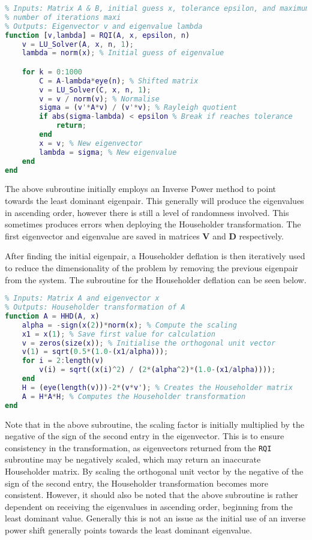 \documentclass[11pt,oneside]{article}
\begin{document}
\begin{lstlisting}[language=Matlab]
%% Rayleigh Quotient function to find eigenvalues and eigenvectors
% Inputs: Matrix A & B, initial guess x, tolerance epsilon, and maximum
% number of iterations maxi
% Outputs: Eigenvector v and eigenvalue lambda
function [v,lambda] = RQI(A, x, epsilon, n)
    v = LU_Solver(A, x, n, 1);
    lambda = norm(x); % Initial guess of eigenvalue

    for k = 0:1000
        C = A-lambda*eye(n); % Shifted matrix
        v = LU_Solver(C, x, n, 1); 
        v = v / norm(v); % Normalise
        sigma = (v'*A*v) / (v'*v); % Rayleigh quotient
        if abs(sigma-lambda) < epsilon % Break if reaches tolerance
            return;
        end
        x = v; % New eigenvector
        lambda = sigma; % New eigenvalue
    end
end
\end{lstlisting}

The above subroutine initially employs an Inverse Power method to point towards the least dominant eigenpair. This generally will produce the eigenvalues in ascending order, however there is still a level of randomness involved. This sometimes produces errors when deploying the Householder transformation. The first eigenvector and eigenvalue are saved in matrices \textbf{V} and \textbf{D} respectively. 

After finding the initial eigenpair, a Householder deflation is then iteratively used to reduce the dimensionality of the problem by removing the previous eigenpair from the system. The subroutine for the Householder deflation can be seen below.

\begin{lstlisting}[language=Matlab]
%% Function to perform Householder transformation
% Inputs: Matrix A and eigenvector x
% Outputs: Householder transformation of A
function A = HHD(A, x)
    alpha = -sign(x(2))*norm(x); % Compute the scaling
    x1 = x(1); % Save first value for calculation
    v = zeros(size(x)); % Initialise the orthogonal unit vector
    v(1) = sqrt(0.5*(1.0-(x1/alpha)));
    for i = 2:length(v)
        v(i) = sqrt((x(i)^2) / (2*(alpha^2)*(1.0-(x1/alpha))));
    end
    H = (eye(length(v)))-2*(v*v'); % Creates the Householder matrix
    A = H*A*H; % Computes the Householder transformation
end
\end{lstlisting}

Note that in the above subroutine, the scaling factor is initially multiplied by the negative of the sign of the second entry in the eigenvector. This is to ensure consistency in the transformation, as eigenvectors returned from the \texttt{RQI} subroutine may be negatively scaled, which may return an inaccurate Householder matrix. By scaling the orthogonal unit vector by the negative of the sign of the second entry, the Householder transformation becomes more consistent. However, it should also be noted that the above subroutine is rather dependent on receiving the eigenvalues in ascending order, beginning from the least dominant value. Generally this is not an issue as the initial use of an inverse power shift generally points towards the least dominant eigenvalue.
\end{document}
